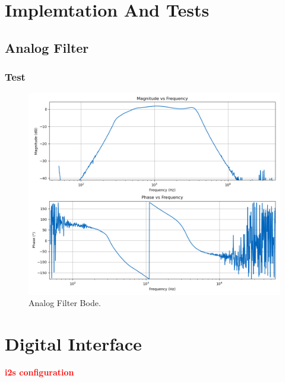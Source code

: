 \section{Implemtation And Tests}

\subsection{Analog Filter}

\subsubsection{Test}

\begin{figure}[H]
    \centering
    \includegraphics*[scale = 0.5]{Images/AnalogFilterScoppyBode.png}
    \caption{Analog Filter Bode.}
    \label{fig:AnalogFilterBodeScoppy}
\end{figure}

\section{Digital Interface}

\textcolor{red}{\textbf{i2s configuration}}
